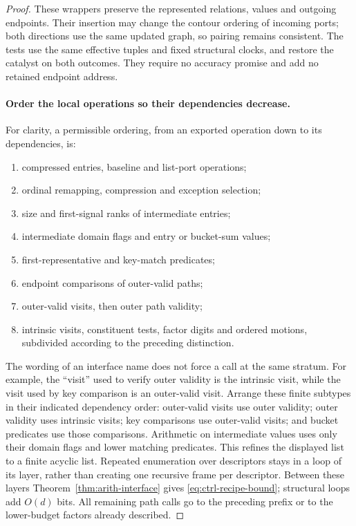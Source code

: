 \begin{proof}
These wrappers preserve the represented relations, values and outgoing
endpoints. Their insertion may change the contour ordering of incoming
ports; both directions use the same updated graph, so pairing remains
consistent. The tests use the same effective tuples and fixed structural
clocks, and restore the catalyst on both outcomes. They require no
accuracy promise and add no retained endpoint address.

\paragraph{Order the local operations so their dependencies decrease.}
For clarity, a permissible ordering, from an exported operation down
to its dependencies, is:
\begin{enumerate}
\item compressed entries, baseline and list-port operations;
\item ordinal remapping, compression and exception selection;
\item size and first-signal ranks of intermediate entries;
\item intermediate domain flags and entry or bucket-sum values;
\item first-representative and key-match predicates;
\item endpoint comparisons of outer-valid paths;
\item outer-valid visits, then outer path validity;
\item intrinsic visits, constituent tests, factor digits and ordered
  motions, subdivided according to the preceding distinction.
\end{enumerate}
The wording of an interface name does not force a call at the same
stratum.  For example, the ``visit'' used to verify outer validity is
the intrinsic visit, while the visit used by key comparison is an
outer-valid visit.  Arrange these finite subtypes in their indicated
dependency order: outer-valid visits use outer validity; outer validity
uses intrinsic visits; key comparisons use outer-valid visits; and
bucket predicates use those comparisons.  Arithmetic on intermediate
values uses only their domain flags and lower matching predicates.
This refines the displayed list to a finite acyclic list.  Repeated
enumeration over descriptors stays in a loop of its layer, rather than
creating one recursive frame per descriptor.  Between these layers
Theorem~\ref{thm:arith-interface} gives \eqref{eq:ctrl-recipe-bound};
structural loops add $O(d)$ bits.  All remaining path calls go to the
preceding prefix or to the lower-budget factors already described.


\end{proof}
